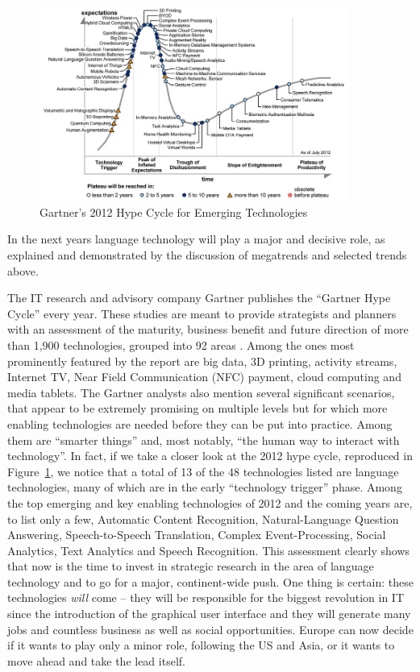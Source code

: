 \documentclass[10pt, plain]{../../metanetpaper}
\begin{document}
\begin{multicols}{2}
\begin{figure}[htb]
  \center
  \includegraphics[width=0.9\textwidth]{../_media/Gartner-2012-Hype-Cycle.jpeg}
  \caption{Gartner's 2012 Hype Cycle for Emerging Technologies \cite{gartner2012}}
  \label{fig:hype-cycle}
\end{figure}


In the next years language technology will play a major and decisive role, as explained and demonstrated by the discussion of megatrends and selected trends above. 

The IT research and advisory company Gartner publishes the ``Gartner Hype Cycle'' every year. These studies are meant to provide strategists and planners with an assessment of the maturity, business benefit and future direction of more than 1,900 technologies, grouped into 92 areas \cite{gartner2012}. Among the ones most prominently featured by the report are big data, 3D printing, activity streams, Internet TV, Near Field Communication (NFC) payment, cloud computing and media tablets. The Gartner analysts also mention several significant scenarios, that appear to be extremely promising on multiple levels but for which more enabling technologies are needed before they can be put into practice. Among them are  ``smarter things'' and, most notably, ``the human way to interact with technology''. In fact, if we take a closer look at the 2012 hype cycle, reproduced in Figure~\ref{fig:hype-cycle}, we notice that a total of 13 of the 48 technologies listed are language technologies, many of which are in the early ``technology trigger'' phase. Among the top emerging and key enabling technologies of 2012 and the coming years are, to list only a few, Automatic Content Recognition, Natural-Language Question Answering, Speech-to-Speech Translation, Complex Event-Processing, Social Analytics, Text Analytics and Speech Recognition. This assessment clearly shows that now is the time to invest in strategic research in the area of language technology and to go for a major, continent-wide push. One thing is certain: these technologies \emph{will} come -- they will be responsible for the biggest revolution in IT since the introduction of the graphical user interface and they will generate many jobs and countless business as well as social opportunities. Europe can now decide if it wants to play only a minor role, following the US and Asia, or it wants to move ahead and take the lead itself.
\end{multicols}
\end{document}
